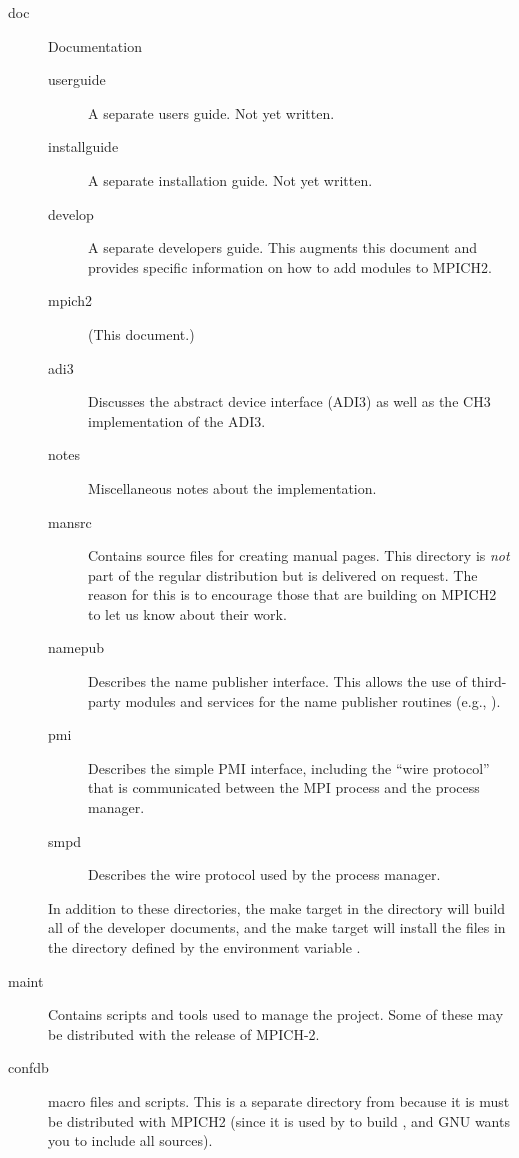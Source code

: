 \documentclass{article}
\begin{document}
\begin{description}
\item[doc]Documentation
  \begin{description}
    \item[userguide]A separate users guide.  Not yet written.
    \item[installguide]A separate installation guide.  Not yet written.
    \item[develop]A separate developers guide.  This augments this
    document and provides specific information on how to add modules
    to MPICH2.
    \item[mpich2] (This document.)
    \item[adi3]Discusses the abstract device interface (ADI3) as well
    as the CH3 implementation of the ADI3.
    \item[notes]Miscellaneous notes about the implementation.
    \item[mansrc]Contains source files for creating manual pages.  This 
    directory is \emph{not} part of the regular distribution but is delivered 
    on request.  The reason for this is to encourage those that are
    building on MPICH2 to let us know about their work.
    \item[namepub]Describes the name publisher interface.  This allows
    the use of third-party modules and services for the name publisher
    routines (e.g., ).  
    \item[pmi]Describes the simple PMI interface, including the ``wire
    protocol'' that is communicated between the MPI process and the
    process manager.
    \item[smpd]Describes the wire protocol used by the 
    process manager.
  \end{description}
  In addition to these directories, the make target  in
  the  directory will build all of the developer documents,
  and the make target  will install the files in
  the directory defined by the environment variable
  . 

\item[maint]
  Contains scripts and tools used to manage the project.  Some of these may be
  distributed with the release of MPICH-2.

\item[confdb] macro files and scripts.  This is a
separate directory from  because it is must be distributed
with MPICH2 (since it is used by  to build
, and GNU wants you to include all sources).


\end{description}
\end{document}
